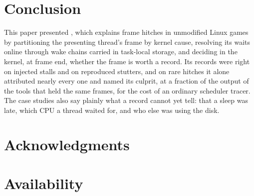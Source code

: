 \section{Conclusion}

This paper presented \sys, which explains frame hitches in unmodified Linux
games by partitioning the presenting thread's frame by kernel cause,
resolving its waits online through wake chains carried in task-local
storage, and deciding in the kernel, at frame end, whether the frame is
worth a record. Its records were right on injected stalls and on
reproduced stutters, and on rare hitches it alone attributed nearly every
one and named its culprit, at a fraction of the output of the tools that
held the same frames, for the cost of an ordinary scheduler tracer. The
case studies also say plainly what a record cannot yet tell: that a sleep
was late, which CPU a thread waited for, and who else was using the disk.

\section*{Acknowledgments}


\section*{Availability}

